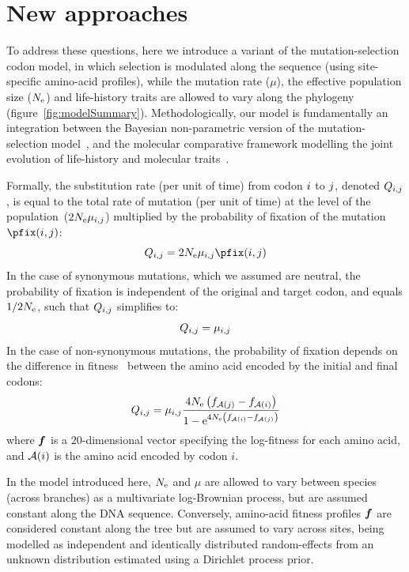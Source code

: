 \documentclass{MBE}
\begin{document}
	\section{New approaches}
	\label{sec:NewApproaches}

	To address these questions, here we introduce a variant of the mutation-selection {codon} model, in which selection is modulated along the sequence (using site-specific amino-acid profiles), while the mutation rate ($\mu$), the {effective population size} ($N_{\text{e}}$) and life-history traits are allowed to vary along the phylogeny (figure~\ref{fig:modelSummary}).
	Methodologically, our model is fundamentally an integration between the Bayesian non-parametric version of the \citet{Halpern1998} mutation-selection model~\citep{Rodrigue2014}, and the molecular comparative framework modelling the joint evolution of life-history and molecular traits~\citep{Lartillot2011}.


	Formally, the {substitution} rate (per unit of time) from {codon} ${i}$ to ${j}$, denoted $Q_{{i}, {j}}$, is equal to the total rate of mutation (per unit of time) at the level of the population~($2N_{\text{e}}\mu_{{i}, {j}}$) multiplied by the probability of fixation of the mutation $\pfix(\itoj)$:
	\begin{equation}
	{\submatrix_{\itoj}}
		= 2 \Ne \mu_{\itoj} \pfix(\itoj)
	\end{equation}
	In the case of {synonymous} mutations, which we assumed are {neutral}, the probability of fixation is independent of the original and target {codon}, and equals $1/2 N_{\text{e}}$, such that ${Q_{{i}, {j}}}$ simplifies to:
	\begin{equation}
		Q_{{i}, {j}} = \mu_{{i}, {j}}
	\end{equation}
	In the case of {non-synonymous} mutations, the probability of fixation depends on the difference in fitness~\citep{Ohta1992} between the amino acid encoded by the initial and final codons:
	\begin{equation}
		\label{eq:mutationSelection}
		{\submatrix_{\itoj}} = \mu_{\itoj} \dfrac{4 \Ne \left({\fitj - \fiti}\right)}{{1 - \e^{4 \Ne \left({\fiti - \fitj}\right)} }}
	\end{equation}
	where $\bm{f}$ is a $20$-dimensional vector specifying the log-fitness for each amino acid, and $\mathcal{A}({i})$ is the amino acid encoded by {codon} $i$.

	In the model introduced here, $N_{\text{e}}$ and $\mu$ are allowed to vary between species (across branches) as a multivariate log-Brownian process, but are assumed constant along the {DNA} sequence.
	Conversely, amino-acid fitness profiles $\bm{f}$ are considered constant along the tree but are assumed to vary across sites, being modelled as independent and identically distributed random-effects from an unknown distribution estimated using a {Dirichlet process} {prior}.
\end{document}
